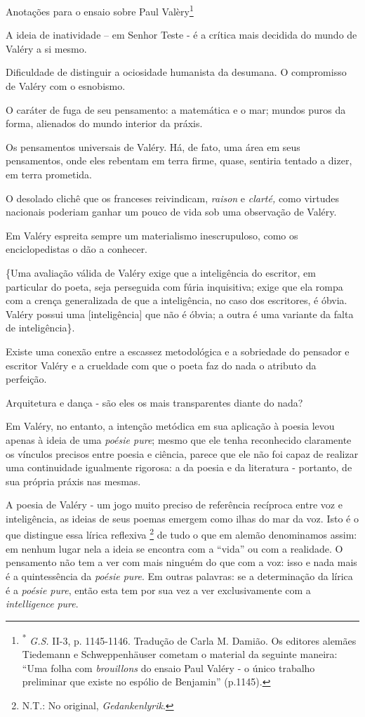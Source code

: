 Anotações para o ensaio sobre Paul Valèry\footnote{\textsuperscript{*}
  \emph{G.S.} II-3, p. 1145-1146. Tradução de Carla M. Damião. Os
  editores alemães Tiedemann e Schweppenhäuser cometam o material da
  seguinte maneira: ``Uma folha com \emph{brouillons} do ensaio Paul
  Valéry - o único trabalho preliminar que existe no espólio de
  Benjamin'' (p.1145).}

A ideia de inatividade -- em Senhor Teste - é a crítica mais decidida do
mundo de Valéry a si mesmo.

Dificuldade de distinguir a ociosidade humanista da desumana. O
compromisso de Valéry com o esnobismo.

O caráter de fuga de seu pensamento: a matemática e o mar; mundos puros
da forma, alienados do mundo interior da práxis.

Os pensamentos universais de Valéry. Há, de fato, uma área em seus
pensamentos, onde eles rebentam em terra firme, quase, sentiria tentado
a dizer, em terra prometida.

O desolado clichê que os franceses reivindicam, \emph{raison} e
\emph{clarté,} como virtudes nacionais poderiam ganhar um pouco de vida
sob uma observação de Valéry.

Em Valéry espreita sempre um materialismo inescrupuloso, como os
enciclopedistas o dão a conhecer.

\{Uma avaliação válida de Valéry exige que a inteligência do escritor,
em particular do poeta, seja perseguida com fúria inquisitiva; exige que
ela rompa com a crença generalizada de que a inteligência, no caso dos
escritores, é óbvia. Valéry possui uma {[}inteligência{]} que não é
óbvia; a outra é uma variante da falta de inteligência\}.

Existe uma conexão entre a escassez metodológica e a sobriedade do
pensador e escritor Valéry e a crueldade com que o poeta faz do nada o
atributo da perfeição.

Arquitetura e dança - são eles os mais transparentes diante do nada?

Em Valéry, no entanto, a intenção metódica em sua aplicação à poesia
levou apenas à ideia de uma \emph{poésie pure}; mesmo que ele tenha
reconhecido claramente os vínculos precisos entre poesia e ciência,
parece que ele não foi capaz de realizar uma continuidade igualmente
rigorosa: a da poesia e da literatura - portanto, de sua própria práxis
nas mesmas.

A poesia de Valéry - um jogo muito preciso de referência recíproca entre
voz e inteligência, as ideias de seus poemas emergem como ilhas do mar
da voz. Isto é o que distingue essa lírica reflexiva \footnote{N.T.: No
  original, \emph{Gedankenlyrik}.} de tudo o que em alemão denominamos
assim: em nenhum lugar nela a ideia se encontra com a ``vida'' ou com a
realidade. O pensamento não tem a ver com mais ninguém do que com a voz:
isso e nada mais é a quintessência da \emph{poésie pure}. Em outras
palavras: se a determinação da lírica é a \emph{poésie pure}, então esta
tem por sua vez a ver exclusivamente com a \emph{intelligence}
\emph{pure}.

